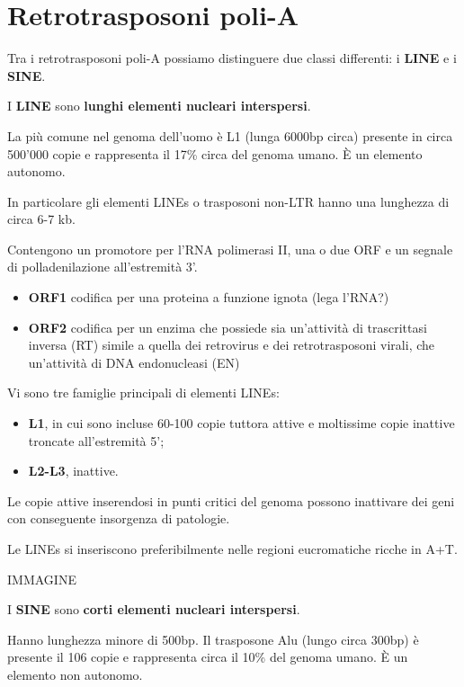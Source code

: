 \documentclass[11pt]{book}
\begin{document}
\section{Retrotrasposoni poli-A}\label{retrotrasposoni-poli-a-1}

Tra i retrotrasposoni poli-A possiamo distinguere due classi differenti:
i \textbf{LINE} e i \textbf{SINE}.

I \textbf{LINE} sono \textbf{lunghi elementi nucleari interspersi}.

La più comune nel genoma dell'uomo è L1 (lunga 6000bp circa) presente in
circa 500'000 copie e rappresenta il 17\% circa del genoma umano. È un
elemento autonomo.

In particolare gli elementi LINEs o trasposoni non-LTR hanno una
lunghezza di circa 6-7 kb.

Contengono un promotore per l'RNA polimerasi II, una o due ORF e un
segnale di polladenilazione all'estremità 3'.

\begin{itemize}
\itemsep1pt\parskip0pt
\item
  \textbf{ORF1} codifica per una proteina a funzione ignota (lega
  l'RNA?)
\item
  \textbf{ORF2} codifica per un enzima che possiede sia un'attività di
  trascrittasi inversa (RT) simile a quella dei retrovirus e dei
  retrotrasposoni virali, che un'attività di DNA endonucleasi (EN)
\end{itemize}

Vi sono tre famiglie principali di elementi LINEs:

\begin{itemize}
\itemsep1pt\parskip0pt
\item
  \textbf{L1}, in cui sono incluse 60-100 copie tuttora attive e
  moltissime copie inattive troncate all'estremità 5';
\item
  \textbf{L2-L3}, inattive.
\end{itemize}

Le copie attive inserendosi in punti critici del genoma possono
inattivare dei geni con conseguente insorgenza di patologie.

Le LINEs si inseriscono preferibilmente nelle regioni eucromatiche
ricche in A+T.

IMMAGINE

I \textbf{SINE} sono \textbf{corti elementi nucleari interspersi}.

Hanno lunghezza minore di 500bp. Il trasposone Alu (lungo circa 300bp) è
presente il 106 copie e rappresenta circa il 10\% del genoma umano. È un
elemento non autonomo.
\end{document}
